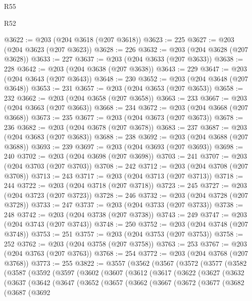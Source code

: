 \begin{lexlean}{R55}
\begin{lexlean}{R52}
\begin{coremodule}
{{{{{{{{{{{{{{{{{{{{{{{{{{{{{{{{{{{{{{{{{{{{{{{{{{{{{{{{{{{{{{{{{{{{{{{{{{{{{{{{{{{{{{{{{{{{{{{{{{{{{{{{{{{{{{{{{{{{{{{{{{{{{{{{{{{{{{{{{{{{{{{{{{{{{{{{{{{{{{{{{{{{{{{{{{{{{{{{{{{{{{{{{{{{{{{{{{{{{{@3622 := @203 (@204 @3618 (@207 @3618))
@3623 := 225
@3627 := @203 (@204 @3623 (@207 @3623))
@3628 := 226
@3632 := @203 (@204 @3628 (@207 @3628))
@3633 := 227
@3637 := @203 (@204 @3633 (@207 @3633))
@3638 := 228
@3642 := @203 (@204 @3638 (@207 @3638))
@3643 := 229
@3647 := @203 (@204 @3643 (@207 @3643))
@3648 := 230
@3652 := @203 (@204 @3648 (@207 @3648))
@3653 := 231
@3657 := @203 (@204 @3653 (@207 @3653))
@3658 := 232
@3662 := @203 (@204 @3658 (@207 @3658))
@3663 := 233
@3667 := @203 (@204 @3663 (@207 @3663))
@3668 := 234
@3672 := @203 (@204 @3668 (@207 @3668))
@3673 := 235
@3677 := @203 (@204 @3673 (@207 @3673))
@3678 := 236
@3682 := @203 (@204 @3678 (@207 @3678))
@3683 := 237
@3687 := @203 (@204 @3683 (@207 @3683))
@3688 := 238
@3692 := @203 (@204 @3688 (@207 @3688))
@3693 := 239
@3697 := @203 (@204 @3693 (@207 @3693))
@3698 := 240
@3702 := @203 (@204 @3698 (@207 @3698))
@3703 := 241
@3707 := @203 (@204 @3703 (@207 @3703))
@3708 := 242
@3712 := @203 (@204 @3708 (@207 @3708))
@3713 := 243
@3717 := @203 (@204 @3713 (@207 @3713))
@3718 := 244
@3722 := @203 (@204 @3718 (@207 @3718))
@3723 := 245
@3727 := @203 (@204 @3723 (@207 @3723))
@3728 := 246
@3732 := @203 (@204 @3728 (@207 @3728))
@3733 := 247
@3737 := @203 (@204 @3733 (@207 @3733))
@3738 := 248
@3742 := @203 (@204 @3738 (@207 @3738))
@3743 := 249
@3747 := @203 (@204 @3743 (@207 @3743))
@3748 := 250
@3752 := @203 (@204 @3748 (@207 @3748))
@3753 := 251
@3757 := @203 (@204 @3753 (@207 @3753))
@3758 := 252
@3762 := @203 (@204 @3758 (@207 @3758))
@3763 := 253
@3767 := @203 (@204 @3763 (@207 @3763))
@3768 := 254
@3772 := @203 (@204 @3768 (@207 @3768))
@3773 := 255
@3822 := @3557
    (@3562
      (@3567
        (@3572
          (@3577
            (@3582
              (@3587
                (@3592
                  (@3597
                    (@3602
                      (@3607
                        (@3612
                          (@3617
                            (@3622
                              (@3627
                                (@3632
                                  (@3637
                                    (@3642
                                      (@3647
                                        (@3652
                                          (@3657
                                            (@3662
                                              (@3667
                                                (@3672
                                                  (@3677
                                                    (@3682
                                                      (@3687
                                                        (@3692
}}}}}}}}}}}}}}}}}}}}}}}}}}}}}}}}}}}}}}}}}}}}}}}}}}}}}}}}}}}}}}}}}}}}}}}}}}}}}}}}}}}}}}}}}}}}}}}}}}}}}}}}}}}}}}}}}}}}}}}}}}}}}}}}}}}}}}}}}}}}}}}}}}}}}}}}}}}}}}}}}}}}}}}}}}}}}}}}}}}}}}}}}}}}}}}}}}}}}}
\end{coremodule}
\end{lexlean}
\end{lexlean}
